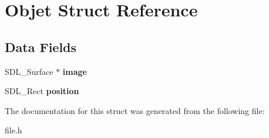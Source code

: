 \hypertarget{structObjet}{}\section{Objet Struct Reference}
\label{structObjet}
\subsection*{Data Fields}
\begin{DoxyCompactItemize}
\item 
\mbox{\label{structObjet_adc26449d5051fc613b8972a08a3e7bba}} 
S\+D\+L\+\_\+\+Surface $\ast$ {\bfseries image}
\item 
\mbox{\label{structObjet_a92fd979dc6d37621933bf051914da800}} 
S\+D\+L\+\_\+\+Rect {\bfseries position}
\end{DoxyCompactItemize}


The documentation for this struct was generated from the following file\+:\begin{DoxyCompactItemize}
\item 
file.\+h\end{DoxyCompactItemize}
